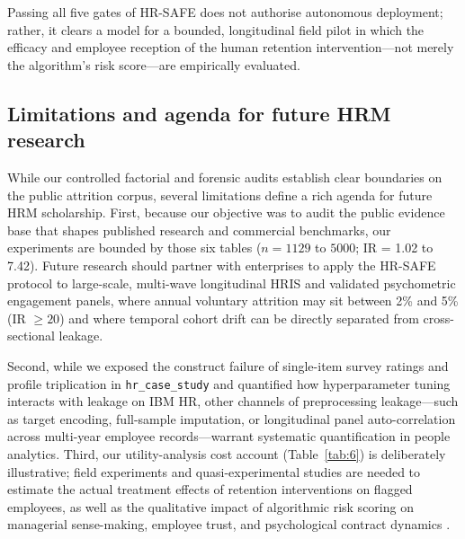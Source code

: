 \documentclass[12pt,a4paper]{article}
\begin{document}
Passing all five gates of HR-SAFE does not authorise autonomous deployment; rather, it clears a model for a bounded, longitudinal field pilot in which the efficacy and employee reception of the human retention intervention---not merely the algorithm's risk score---are empirically evaluated.

\subsection{Limitations and agenda for future HRM research}
While our controlled factorial and forensic audits establish clear boundaries on the public attrition corpus, several limitations define a rich agenda for future HRM scholarship. First, because our objective was to audit the public evidence base that shapes published research and commercial benchmarks, our experiments are bounded by those six tables ($n = 1129$ to $5000$; IR = 1.02 to 7.42). Future research should partner with enterprises to apply the HR-SAFE protocol to large-scale, multi-wave longitudinal HRIS and validated psychometric engagement panels, where annual voluntary attrition may sit between 2\% and 5\% (IR $\ge 20$) and where temporal cohort drift can be directly separated from cross-sectional leakage.

Second, while we exposed the construct failure of single-item survey ratings and profile triplication in \texttt{hr\_case\_study} and quantified how hyperparameter tuning interacts with leakage on IBM HR, other channels of preprocessing leakage---such as target encoding, full-sample imputation, or longitudinal panel auto-correlation across multi-year employee records---warrant systematic quantification in people analytics. Third, our utility-analysis cost account (Table~\ref{tab:6}) is deliberately illustrative; field experiments and quasi-experimental studies are needed to estimate the actual treatment effects of retention interventions on flagged employees, as well as the qualitative impact of algorithmic risk scoring on managerial sense-making, employee trust, and psychological contract dynamics \parencite{ref61,ref60,ref58}.
\end{document}
